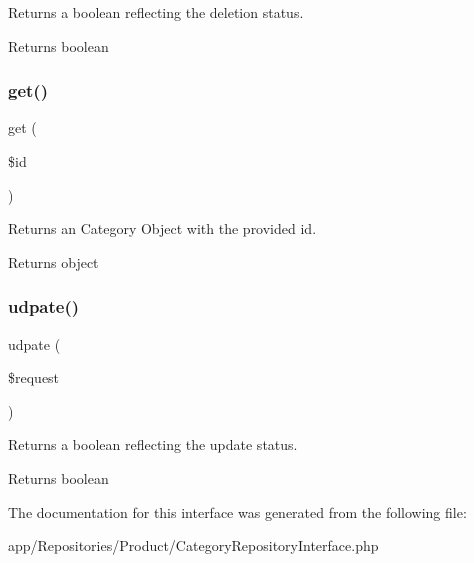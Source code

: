 Returns a boolean reflecting the deletion status.

\begin{DoxyReturn}{Returns}
boolean 
\end{DoxyReturn}
\mbox{\label{interface_app_1_1_repositories_1_1_product_1_1_category_repository_interface_a50e3bfb586b2f42932a6a93f3fbb0828}} 
\subsubsection{\texorpdfstring{get()}{get()}}
{\footnotesize\ttfamily get (\begin{DoxyParamCaption}\item[{}]{\$id }\end{DoxyParamCaption})}

Returns an Category Object with the provided id.

\begin{DoxyReturn}{Returns}
object 
\end{DoxyReturn}
\mbox{\label{interface_app_1_1_repositories_1_1_product_1_1_category_repository_interface_a2aedea52c52e54ba3c4c9f60423e7ef1}} 
\subsubsection{\texorpdfstring{udpate()}{udpate()}}
{\footnotesize\ttfamily udpate (\begin{DoxyParamCaption}\item[{}]{\$request }\end{DoxyParamCaption})}

Returns a boolean reflecting the update status.

\begin{DoxyReturn}{Returns}
boolean 
\end{DoxyReturn}


The documentation for this interface was generated from the following file\+:\begin{DoxyCompactItemize}
\item 
app/\+Repositories/\+Product/Category\+Repository\+Interface.\+php\end{DoxyCompactItemize}

